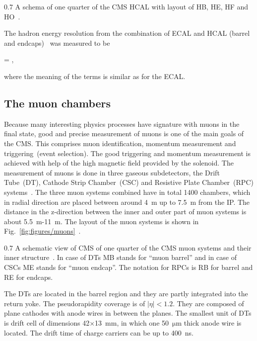                  {0.7}       
                 {A schema of one quarter of the CMS HCAL with layout of HB, HE, HF and HO~\cite{Chatrchyan:2008aa}. }

The hadron energy resolution from the combination of ECAL and HCAL (barrel and endcaps)~\cite{Chatrchyan:2009ag} was measured to be


{
  =   ,
}

where the meaning of the terms is similar as for the ECAL.

\subsection{The muon chambers}

Because many interesting physics processes have signature with muons in the final state, good and precise measurement of muons is one of the main goals of the CMS. This comprises muon identification, momentum measurement and triggering~(event selection). The good triggering and momentum measurement is achieved with help of the high magnetic field provided by the solenoid. The measurement of muons is done in three gaseous subdetectors, the Drift Tube~(DT), Cathode Strip Chamber~(CSC) and Resistive Plate Chamber~(RPC) systems~\cite{tdrMuon}. The three muon systems combined have in total 1400 chambers, which in radial direction are placed between around 4~m up to 7.5~m from the IP. The distance in the z-direction between the inner and outer part of muon systems is about 5.5~m-11~m. The layout of the muon systems is shown in Fig.~\ref{fig:figures/muons}~\cite{Chatrchyan:2013sba}.

                 {0.7}       
                 {A schematic view of CMS of one quarter of the CMS muon systems and their inner structure~\cite{Chatrchyan:2013sba}. In case of DTs MB stands for ``muon barrel'' and in case of CSCs ME stands for ``muon endcap''. The notation for RPCs is RB for barrel and RE for endcaps. }

The DTs are located in the barrel region and they are partly integrated into the return yoke.  The pseudorapidity coverage is of $|\eta|<1.2$. They are composed of plane cathodes with anode wires in between the planes. The smallest unit of DTs is drift cell of dimensions 42$\times$13~mm, in which one 50~$\mathrm{\mu m}$ thick anode wire is located. The drift time of charge carriers can be up to 400~ns.

